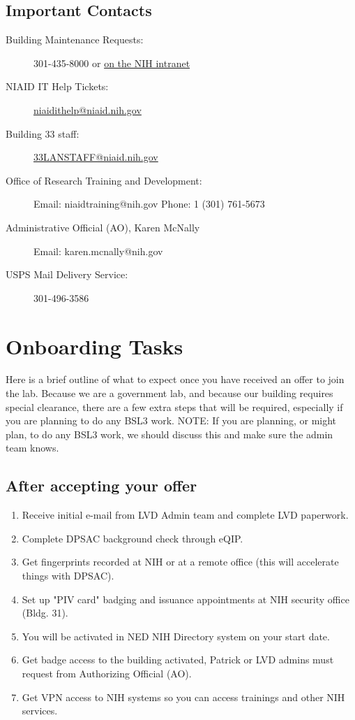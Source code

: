 \documentclass[10pt, letterpaper, twocolumn]{article} %
\begin{document}
\subsection{Important Contacts}
\begin{description}
\item [Building Maintenance Requests:] 301-435-8000 or \href{https://www.orf.od.nih.gov/PropertyManagement/MaintenanceServiceRequests/Pages/default.aspx}{on the NIH intranet}
\item [NIAID IT Help Tickets:]
\href{mailto:niaidithelp@niaid.nih.gov}{niaidithelp@niaid.nih.gov}
\item [Building 33 staff:] \href{mailto:33LANSTAFF@niaid.nih.gov}{33LANSTAFF@niaid.nih.gov}
\item [Office of Research Training and Development:]
Email: niaidtraining@nih.gov\newline
Phone: 1 (301) 761-5673
\item [Administrative Official (AO), Karen McNally]
Email: karen.mcnally@nih.gov
\item [USPS Mail Delivery Service:] 301-496-3586
\end{description}

\section{Onboarding Tasks}
Here is a brief outline of what to expect once you have received an offer to join the lab. Because we are a government lab, and because our building requires special clearance, there are a few extra steps that will be required, especially if you are planning to do any BSL3 work.
NOTE: If you are planning, or might plan, to do any BSL3 work, we should discuss this and make sure the admin team knows.

\subsection{After accepting your offer}
\begin{enumerate}
\item Receive initial e-mail from LVD Admin team and complete LVD paperwork.
\item Complete DPSAC background check through eQIP.
\item Get fingerprints recorded at NIH or at a remote office (this will accelerate things with DPSAC).
\item Set up "PIV card" badging and issuance appointments at NIH security office (Bldg. 31).
\item You will be activated in NED NIH Directory system on your start date.
\item Get badge access to the building activated, Patrick or LVD admins must request from Authorizing Official (AO).
\item Get VPN access to NIH systems so you can access trainings and other NIH services.
\end{enumerate}
\end{document}

